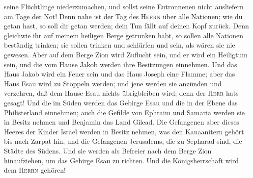 seine Flüchtlinge niederzumachen, und sollst seine Entronnenen nicht
ausliefern am Tage der Not!  Denn nahe ist der Tag des
\textsc{Herrn} über alle Nationen; wie du getan hast, so soll dir getan
werden; dein Tun fällt auf deinen Kopf zurück.  Denn
gleichwie ihr auf meinem heiligen Berge getrunken habt, so sollen alle
Nationen beständig trinken; sie sollen trinken und schlürfen und sein,
als wären sie nie gewesen.  Aber auf dem Berge Zion wird
Zuflucht sein, und er wird ein Heiligtum sein, und die vom Hause Jakob
werden ihre Besitzungen einnehmen.  Und das Haus Jakob
wird ein Feuer sein und das Haus Joseph eine Flamme; aber das Haus Esau
wird zu Stoppeln werden; und jene werden sie anzünden und verzehren, daß
dem Hause Esau nichts übrigbleiben wird; denn der \textsc{Herr}
hat\textquotesingle s gesagt!  Und die im Süden werden
das Gebirge Esau und die in der Ebene das Philisterland einnehmen; auch
die Gefilde von Ephraim und Samaria werden sie in Besitz nehmen und
Benjamin das Land Gilead.  Die Gefangenen aber dieses
Heeres der Kinder Israel werden in Besitz nehmen, was den Kanaanitern
gehört bis nach Zarpat hin, und die Gefangenen Jerusalems, die zu
Sepharad sind, die Städte des Südens.  Und sie werden als
Befreier nach dem Berge Zion hinaufziehen, um das Gebirge Esau zu
richten. Und die Königsherrschaft wird dem \textsc{Herrn} gehören!
